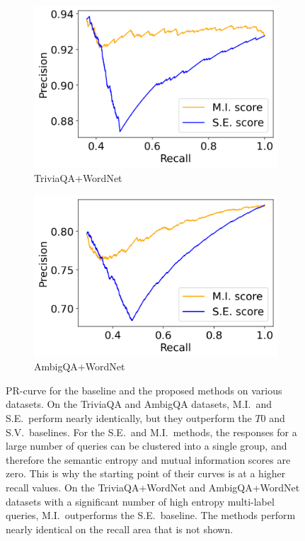 \documentclass[a4paper]{article}
\theoremstyle{plain}
\theoremstyle{definition}
\theoremstyle{plain}
\begin{document}
\begin{figure}[t]
\begin{subfigure}{0.24\textwidth}
       \includegraphics[width=\textwidth]{PR-TriviaQA-WN.png} 
    \caption{TriviaQA+WordNet} \label{fig:PRc}
  \end{subfigure}
  \begin{subfigure}{0.24\textwidth}
       \includegraphics[width=\textwidth]{PR-AmbigQA-WN.png}
    \caption{AmbigQA+WordNet} \label{fig:PRd}
  \end{subfigure}
\caption{PR-curve for the baseline and the proposed methods on various datasets. On the TriviaQA and AmbigQA datasets, M.I.\ and S.E.\ perform nearly identically, but they outperform the $T0$ and S.V.\ baselines. For the S.E.\ and M.I.\ methods, the responses for a large number of queries can be clustered into a single group, and therefore the semantic entropy and mutual information scores are zero. This is why the starting point of their curves is at a higher recall values. On the TriviaQA+WordNet and AmbigQA+WordNet datasets with a significant number of high entropy multi-label queries, M.I.\ outperforms the S.E.\ baseline. The methods perform nearly identical on the recall area that is not shown. } 
\label{fig:PR}
\end{figure}
\end{document}
